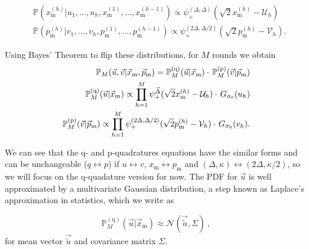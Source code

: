 \documentclass[prx,reprint,superscriptaddress,longbibliography,floatfix,nofootinbib]{revtex4-1}
\begin{document}
\begin{equation}
    \begin{split}
    &\mathbb{P}(x^{(h)}_{\text{m}}|u_1,...,u_h,x^{(1)}_{\text{m}},...,x^{(h-1)}_{\text{m}}) \propto \psi^{(\Delta,\Delta)}_{+}(\sqrt{2}x^{(h)}_{\text{m}}-\mathcal{U}_h)\\
    & \mathbb{P}(p^{(h)}_{\text{m}}|v_1,...,v_h,p^{(1)}_{\text{m}},...,p^{(h-1)}_{\text{m}}) \propto \psi^{(2\Delta,\Delta/2)}_{+}(\sqrt{2}p^{(h)}_{\text{m}}-\mathcal{V}_h).
    \end{split}
\end{equation}

\noindent Using Bayes' Theorem to flip these distributions, for $M$ rounds we obtain
    \begin{equation}
\begin{split}
\mathbb{P}_{M}(\vec{u},\vec{v}|\vec{x}_\text{m},\vec{p}_\text{m}) = \mathbb{P}^{(\text{q})}_{M}(\vec{u}|\vec{x}_\text{m}) \cdot \hspace{0.05cm} \mathbb{P}^{(\text{p})}_{M}(\vec{v}|\vec{p}_\text{m}) 
\\ 
\mathbb{P}^{(\text{q})}_{M}(\vec{u}|\vec{x}_\text{m}) \propto \prod_{h=1}^{M}\psi^{\vec{\Delta}}_{+}(\sqrt{2}x^{(h)}_{\text{m}}-\mathcal{U}_h) \cdot \hspace{0.05cm} G_{\sigma_0}(u_h)
\\
\mathbb{P}^{(\text{p})}_{M}(\vec{v}|\vec{p}_\text{m}) \propto \prod_{h=1}^{M}\psi^{(2\Delta,\Delta/2)}_{+}(\sqrt{2}p^{(h)}_{\text{m}}-\mathcal{V}_h) \cdot \hspace{0.05cm} G_{\sigma_0}(v_h).
\end{split}
\end{equation}

\noindent We can see that the q- and p-quadratures equations have the similar forms and can be unchangeable ($q\leftrightarrow p$) if $u\leftrightarrow v$, $x_{\text{m}}\leftrightarrow p_\text{m}$ and $(\Delta,\kappa) \leftrightarrow (2\Delta,\kappa/2)$, so we will focus on the q-quadature version for now. The PDF for $\vec{u}$ is well approximated by a multivariate Gaussian distribution, a step known as Laplace's approximation in statistics, which we write as

\begin{equation}
\mathbb{P}^{(\text{q})}_{M}(\vec{u}|\vec{x}_\text{m}) \approx \mathcal{N}(\vec{\tilde{u}} , \Sigma) \ ,
\label{eq:gauss_approx}
\end{equation}
for mean vector $\vec{\tilde{u}}$ and covariance matrix $\Sigma$. 
\end{document}
